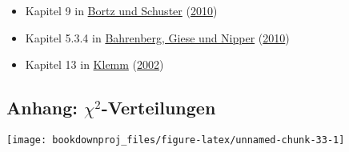 \documentclass[
  ngerman,
]{article}
\providecommand{\tightlist}{%
  \setlength{\itemsep}{0pt}\setlength{\parskip}{0pt}}
\begin{document}
\begin{itemize}
\tightlist
\item
  Kapitel 9 in \protect\hyperlink{ref-bortz}{Bortz und Schuster} (\protect\hyperlink{ref-bortz}{2010})
\item
  Kapitel 5.3.4 in \protect\hyperlink{ref-bahrenberg}{Bahrenberg, Giese und Nipper} (\protect\hyperlink{ref-bahrenberg}{2010})
\item
  Kapitel 13 in \protect\hyperlink{ref-klemm}{Klemm} (\protect\hyperlink{ref-klemm}{2002})
\end{itemize}

\pagebreak

\hypertarget{anhang-chi2-verteilungen}{%
\subsection{\texorpdfstring{Anhang: \(\chi^2\)-Verteilungen}{Anhang: \textbackslash chi\^{}2-Verteilungen}}\label{anhang-chi2-verteilungen}}

\begin{center}\texttt{[image: bookdownproj\_files/figure-latex/unnamed-chunk-33-1]} \end{center}
\end{document}
